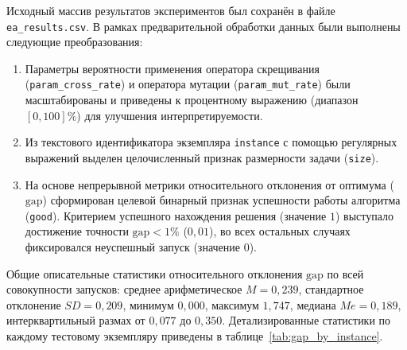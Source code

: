 \documentclass[732]{studrep}
\theoremstyle{nonumberplain}
\begin{document}
Исходный массив результатов экспериментов был сохранён в файле \texttt{ea\_results.csv}. В рамках предварительной обработки данных были выполнены следующие преобразования:
\begin{enumerate}
\item Параметры вероятности применения оператора скрещивания (\texttt{param\_cross\_rate}) и оператора мутации (\texttt{param\_mut\_rate}) были масштабированы и приведены к процентному выражению (диапазон \([0, 100]\%\)) для улучшения интерпретируемости.
\item Из текстового идентификатора экземпляра \texttt{instance} с помощью регулярных выражений выделен целочисленный признак размерности задачи (\texttt{size}).
\item На основе непрерывной метрики относительного отклонения от оптимума (\(\mathrm{gap}\)) сформирован целевой бинарный признак успешности работы алгоритма (\texttt{good}). Критерием успешного нахождения решения (значение \(1\)) выступало достижение точности \(\mathrm{gap} < 1\%\) (\(0{,}01\)), во всех остальных случаях фиксировался неуспешный запуск (значение \(0\)).
\end{enumerate}

Общие описательные статистики относительного отклонения \(\mathrm{gap}\) по всей совокупности запусков: среднее арифметическое \(M = 0{,}239\), стандартное отклонение \(SD = 0{,}209\), минимум \(0{,}000\), максимум \(1{,}747\), медиана \(Me = 0{,}189\), интерквартильный размах от \(0{,}077\) до \(0{,}350\). Детализированные статистики по каждому тестовому экземпляру приведены в таблице~\ref{tab:gap_by_instance}.
\end{document}
